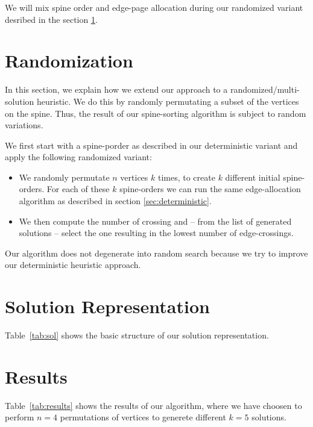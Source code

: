\documentclass{scrartcl}
\begin{document}
We will mix spine order and edge-page allocation during our randomized
variant desribed in the section \ref{sec:randomization}.




\section{Randomization}
\label{sec:randomization}
In this section, we explain how we extend our approach to a
randomized/multi-solution heuristic. We do this by randomly
permutating a subset of the vertices on the spine. Thus, the result of
our spine-sorting algorithm is subject to random variations. 

We first start with a spine-porder as described in our deterministic
variant and apply the following randomized variant:
\begin{itemize}
\item We randomly permutate $n$ vertices $k$ times, to create $k$ different
initial spine-orders. For each of these $k$ spine-orders we can run
the same edge-allocation algorithm as described in section \ref{sec:deterministic}. 

\item We then compute the number of
crossing and -- from the list of generated solutions -- select the one
resulting in the lowest number of edge-crossings. 
\end{itemize}



Our algorithm does not degenerate into random search because we try to
improve our deterministic heuristic approach.


\section{Solution Representation}

Table~\ref{tab:sol} shows the basic structure of our solution representation.

\section{Results}

Table~\ref{tab:results} shows the results of our
algorithm, where we have choosen to perform $n=4$ permutations of vertices to generete different $k=5$ solutions. 
\end{document}
